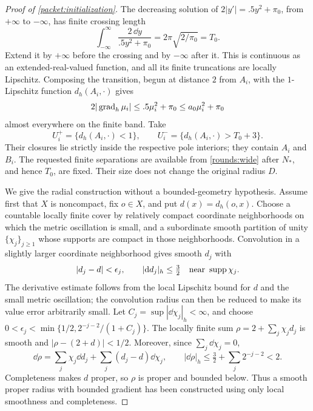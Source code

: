 \begin{proof}[Proof of \cref{packet:initialization}]
The decreasing solution of
$2|y'|=.5y^2+\pi_0$, from $+\infty$ to $-\infty$, has finite
crossing length
\[
 \int_{-\infty}^{\infty}\frac{2\,\dd y}{.5y^2+\pi_0}
       =2\pi\sqrt{2/\pi_0}=T_0.
\]
Extend it by $+\infty$ before the crossing and by $-\infty$ after
it.  This is continuous as an extended-real-valued function, and
all its finite truncations are locally Lipschitz.  Composing the
transition, begun at distance $2$ from $A_i$, with the $1$-Lipschitz
function $d_h(A_i,\cdot)$ gives
\[
 2|\operatorname{grad}_h\mu_i|\le .5\mu_i^2+\pi_0
                    \le a_0\mu_i^2+\pi_0
\]
almost everywhere on the finite band.  Take
\[
 U_i^+=\{d_h(A_i,\cdot)<1\},\qquad
 U_i^-=\{d_h(A_i,\cdot)>T_0+3\}.
\]
Their closures lie strictly inside the respective pole interiors;
they contain $A_i$ and $B_i$.  The requested finite separations are
available from \cref{rounds:wide} after $N_*$, and hence $T_0$, are
fixed.  Their size does not change the original radius $D$.

We give the radial construction without a bounded-geometry
hypothesis.  Assume first that $X$ is noncompact, fix $o\in X$, and
put $d(x)=d_h(o,x)$.  Choose a countable locally finite cover by
relatively compact coordinate neighborhoods on which the metric
oscillation is small, and a subordinate smooth partition of unity
$\{\chi_j\}_{j\ge1}$ whose supports are compact in those neighborhoods.
Convolution in a slightly larger coordinate neighborhood gives
smooth $d_j$ with
\[
 |d_j-d|<\epsilon_j,\qquad |\mathrm d d_j|_h\le\tfrac32
       \quad\hbox{near }\operatorname{supp}\chi_j.
\]
The derivative estimate follows from the local Lipschitz bound for
$d$ and the small metric oscillation; the convolution radius can
then be reduced to make its value error arbitrarily small.
Let $C_j=\sup|\dd\chi_j|_h<\infty$, and choose
$0<\epsilon_j<\min\{1/2,2^{-j-2}/(1+C_j)\}$.
The locally finite sum $\rho=2+\sum_j\chi_jd_j$ is smooth and
$|\rho-(2+d)|<1/2$.  Moreover, since $\sum_j\dd\chi_j=0$,
\[
 \dd\rho=\sum_j\chi_j\dd d_j
             +\sum_j(d_j-d)\dd\chi_j,
 \qquad |\dd\rho|_h\le\tfrac32+\sum_j2^{-j-2}<2.
\]
Completeness makes $d$ proper, so $\rho$ is proper and bounded below.
Thus a smooth proper radius with bounded gradient has been constructed
using only local smoothness and completeness.


\end{proof}
